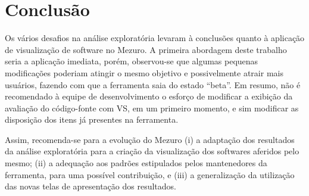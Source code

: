 \chapter[Conclusão]{Conclusão}\label{chap:conclusao}

Os vários desafios na análise exploratória levaram à conclusões quanto à
aplicação de visualização de software no Mezuro. A primeira abordagem deste
trabalho seria a aplicação imediata, porém, observou-se que algumas pequenas
modificações poderiam atingir o mesmo objetivo e possivelmente atrair mais
usuários, fazendo com que a ferramenta saia do estado ``beta''. Em resumo, não
é recomendado à equipe de desenvolvimento o esforço de modificar a exibição da
avaliação do código-fonte com VS, em um primeiro momento, e sim modificar as
disposição dos itens já presentes na ferramenta.

Assim, recomenda-se para a evolução do Mezuro (i) a adaptação dos resultados da
análise exploratória para a criação da visualização dos softwares
aferidos pelo mesmo; (ii) a adequação aos padrões estipulados pelos mantenedores da
ferramenta, para uma possível contribuição, e (iii) a generalização da utilização das
novas telas de apresentação dos resultados. 

